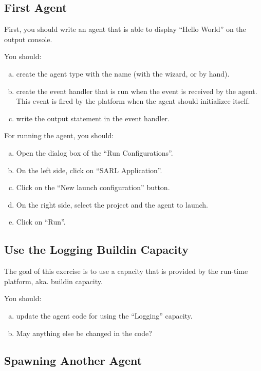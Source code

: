 \documentclass[article,english,nodocumentinfo]{multiagentfrreport}
\begin{document}
\subsection{First Agent}

First, you should write an agent that is able to display ``Hello World'' on the output console.

You should:
\begin{enumerate}[a)]
\item create the agent type with the name  (with the wizard, or by hand).
\item create the event handler that is run when the  event is received by the agent. This event is fired by the platform when the agent should initializee itself.
\item write the output statement in the event handler.
\end{enumerate}

For running the agent, you should:
\begin{enumerate}[a)]
\item Open the dialog box of the ``Run Configurations''.
\item On the left side, click on ``SARL Application''.
\item Click on the ``New launch configuration'' button.
\item On the right side, select the project and the agent to launch.
\item Click on ``Run''.
\end{enumerate}


\subsection{Use the Logging Buildin Capacity}

The goal of this exercise is to use a capacity that is provided by the run-time platform, aka. buildin capacity.

You should:
\begin{enumerate}[a)]
\item update the agent code for using the ``Logging'' capacity.
\item May anything else be changed in the code?
\end{enumerate}

\subsection{Spawning Another Agent}
\end{document}
